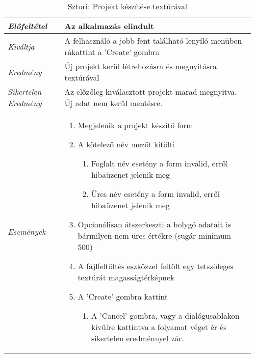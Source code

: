 \begin{table}[H]
	\centering
	\begin{tabular}{ | m{} | m{} | }
		\hline
		\emph{Előfeltétel} & Az alkalmazás elindult  \\
		\hline
		\emph{Kiváltja} & A felhasználó a jobb fent található lenyíló menüben rákattint a 'Create' gombra \\
		\hline
		\emph{Eredmény} & Új projekt kerül létrehozásra és megnyitásra textúrával  \\
		\hline
		\emph{Sikertelen Eredmény} & Az előzőleg kiválasztott projekt marad megnyitva. Új adat nem kerül mentésre.  \\
		\hline
		\hline
		\emph{Események} &

		\begin{enumerate}
			\item Megjelenik a projekt készítő form
			\item A kötelező név mezőt kitölti
			\begin{enumerate}
				\item Foglalt név esetény a form invalid, erről hibaüzenet jelenik meg
				\item Üres név esetény a form invalid, erről hibaüzenet jelenik meg
			\end{enumerate}
			\item Opcionálisan átszerkeszti a bolygó adatait is bármilyen nem üres értékre (sugár minimum 500)
			\item A fájlfeltöltés eszközzel feltölt egy tetszőleges textúrát magasságtérképnek
			\item A 'Create' gombra kattint
			\begin{enumerate}
				\item A 'Cancel' gombra, vagy a dialógusablakon kívülre kattintva a folyamat véget ér és sikertelen eredménnyel zár.
			\end{enumerate}
		\end{enumerate}

		\\
		\hline
	\end{tabular}
	\caption{Sztori: Projekt készítése textúrával}
	\label{tab:story-project-create-texture}
\end{table}

